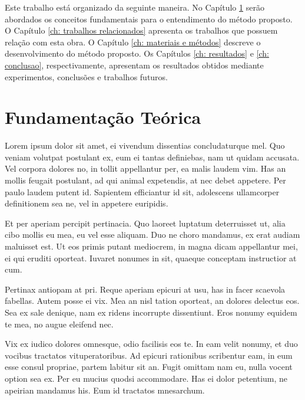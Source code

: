 \documentclass[
	12pt,				%
	openright,			%
	oneside,			%
	a4paper,			%
	english,			%
	french,				%
	spanish,			%
	brazil,				%
	]{abntex2}
\begin{document}
Este trabalho está organizado da seguinte maneira. No Capítulo \ref{ch: fundamentacao teorica} serão abordados os conceitos fundamentais para o entendimento do método proposto. O Capítulo \ref{ch: trabalhos relacionados} apresenta os trabalhos que possuem relação com esta obra. O Capítulo \ref{ch: materiais e métodos} descreve o desenvolvimento do método proposto. Os Capítulos \ref{ch: resultados} e \ref{ch: conclusao}, respectivamente, apresentam os resultados obtidos mediante experimentos, conclusões e trabalhos futuros.


\setcounter{chapter}{1}
\chapter{Fundamentação Teórica}
\label{ch: fundamentacao teorica}

Lorem ipsum dolor sit amet, ei vivendum dissentias concludaturque mel. Quo veniam volutpat postulant ex, eum ei tantas definiebas, nam ut quidam accusata. Vel corpora dolores no, in tollit appellantur per, ea malis laudem vim. Has an mollis feugait postulant, ad qui animal expetendis, at nec debet appetere. Per paulo laudem putent id. Sapientem efficiantur id sit, adolescens ullamcorper definitionem sea ne, vel in appetere euripidis.

Et per aperiam percipit pertinacia. Quo laoreet luptatum deterruisset ut, alia cibo mollis eu mea, eu vel esse aliquam. Duo ne choro mandamus, ex erat audiam maluisset est. Ut eos primis putant mediocrem, in magna dicam appellantur mei, ei qui eruditi oporteat. Iuvaret nonumes in sit, quaeque conceptam instructior at cum.

Pertinax antiopam at pri. Reque aperiam epicuri at usu, has in facer scaevola fabellas. Autem posse ei vix. Mea an nisl tation oporteat, an dolores delectus eos. Sea ex sale denique, nam ex ridens incorrupte dissentiunt. Eros nonumy equidem te mea, no augue eleifend nec.

Vix ex iudico dolores omnesque, odio facilisis eos te. In eam velit nonumy, et duo vocibus tractatos vituperatoribus. Ad epicuri rationibus scribentur eam, in eum esse consul propriae, partem labitur sit an. Fugit omittam nam eu, nulla vocent option sea ex. Per eu mucius quodsi accommodare. Has ei dolor petentium, ne apeirian mandamus his. Eum id tractatos mnesarchum.
\end{document}
